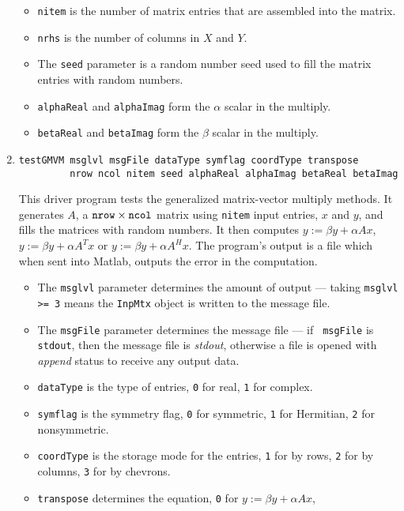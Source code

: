 \begin{enumerate}
\begin{itemize}
\item
{\tt nitem} is the number of matrix entries that are 
assembled into the matrix.
\item
{\tt nrhs} is the number of columns in $X$ and $Y$.
\item
The {\tt seed} parameter is a random number seed used to fill the
matrix entries with random numbers.
\item
{\tt alphaReal} and {\tt alphaImag} 
form the $\alpha$ scalar in the multiply.
\item
{\tt betaReal} and {\tt betaImag} 
form the $\beta$ scalar in the multiply.
\end{itemize}
\item
\begin{verbatim}
testGMVM msglvl msgFile dataType symflag coordType transpose
         nrow ncol nitem seed alphaReal alphaImag betaReal betaImag
\end{verbatim}
This driver program 
tests the generalized matrix-vector multiply methods.
It generates $A$, a 
${\tt nrow} \times {\tt ncol}$
matrix using {\tt nitem} input entries, 
$x$ and $y$,
and fills the matrices with random numbers.
It then computes 
$y := \beta y + \alpha A x$, 
$y := \beta y + \alpha A^T x$ or
$y := \beta y + \alpha A^H x$.
The program's output is a file which when sent into Matlab,
outputs the error in the computation.
\par
\begin{itemize}
\item
The {\tt msglvl} parameter determines the amount of output ---
taking {\tt msglvl >= 3} means the {\tt InpMtx} object is written
to the message file.
\item
The {\tt msgFile} parameter determines the message file --- if {\tt
msgFile} is {\tt stdout}, then the message file is {\it stdout},
otherwise a file is opened with {\it append} status to receive any
output data.
\item
{\tt dataType} is the type of entries,
{\tt 0} for real, {\tt 1} for complex.
\item
{\tt symflag} is the symmetry flag, {\tt 0} for symmetric, 
{\tt 1} for Hermitian, {\tt 2} for nonsymmetric.
\item
{\tt coordType} is the storage mode for the entries, 
{\tt 1} for by rows, {\tt 2} for by columns, 
{\tt 3} for by chevrons. 
\item
{\tt transpose} determines the equation,
{\tt 0} for $y := \beta y + \alpha A x$, 

\end{itemize}
\end{enumerate}
